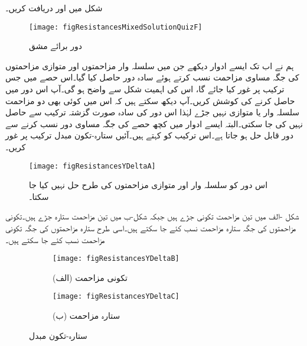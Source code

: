 شکل  میں   اور  دریافت کریں۔
\begin{figure}
\centering
\texttt{[image: figResistancesMixedSolutionQuizF]}
\caption{دور برائے مشق }
\label{شکل_مزاحمتی_متعدد_مشق_ٹ}
\end{figure}
\FloatBarrier
{}
ہم نے اب تک ایسے ادوار دیکھے جن میں سلسلہ وار مزاحمتوں اور متوازی مزاحمتوں کی جگہ مساوی مزاحمت نسب کرتے ہوئے سادہ دور حاصل کیا گیا۔اس حصے میں جس ترکیب پر غور کیا جائے گا، اس کی اہمیت شکل  سے واضح ہو گی۔آپ اس دور میں  حاصل کرنے کی کوشش کریں۔آپ دیکھ سکتے ہیں کہ اس میں کوئی بھی دو مزاحمت سلسلہ وار یا متوازی نہیں جڑے لہٰذا اس دور کی سادہ صورت گزشتہ ترکیب سے حاصل نہیں کی جا سکتی۔البتہ ایسے ادوار میں کچھ حصے  کی جگہ  مساوی دور نسب کرنے سے دور قابل حل ہو جاتا ہے۔اس ترکیب کو  کہتے ہیں۔آئیں ستارہ-تکون مبدل ترکیب پر غور کریں۔ 
\begin{figure}
\centering
\texttt{[image: figResistancesYDeltaA]}
\caption{اس دور کو سلسلہ وار اور متوازی مزاحمتوں کی طرح حل نہیں کیا جا سکتا۔}
\label{شکل_مزاحمتی_ستارہ_تکون_الف}
\end{figure}


شکل -الف میں تین مزاحمت تکونی جڑے ہیں جبکہ شکل-ب میں تین مزاحمت ستارہ جڑے ہیں۔تکونی مزاحمتوں کی جگہ ستارہ مزاحمت نسب کئے جا سکتے ہیں۔اسی طرح ستارہ مزاحمتوں کی جگہ تکونی مزاحمت نسب کئے جا سکتے ہیں۔
\begin{figure}
\centering
\begin{subfigure}{0.5\textwidth}
\centering
\texttt{[image: figResistancesYDeltaB]}
\caption*{(الف) تکونی مزاحمت}
\end{subfigure}%
\begin{subfigure}{0.5\textwidth}
\centering
\texttt{[image: figResistancesYDeltaC]}
\caption*{(ب) ستارہ مزاحمت}
\end{subfigure}%
\caption{ستارہ-تکون مبدل}
\label{شکل_مزاحمتی_ستارہ_تکون_مبدل}
\end{figure}
